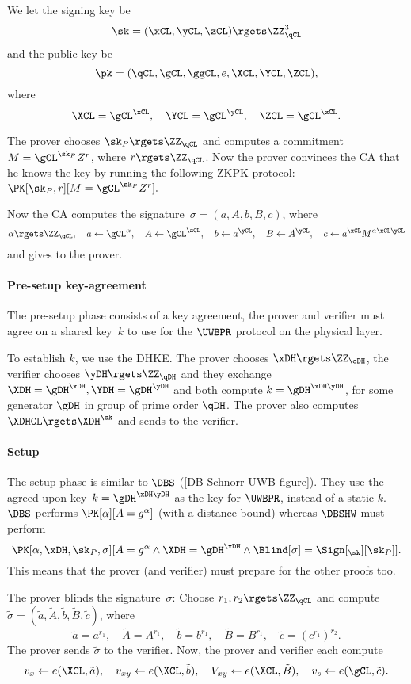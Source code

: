 We let the  signing key be \[
  \sk = (\xCL, \yCL, \zCL)\rgets \ZZ_{\qCL}^3
\] and the public key be \[
  \pk = (\qCL, \gCL, \ggCL, e, \XCL, \YCL, \ZCL),
\] where \[
  \XCL = \gCL^{\xCL}, \quad
  \YCL = \gCL^{\yCL}, \quad
  \ZCL = \gCL^{\zCL}.
\]

The prover chooses \(\sk_P\rgets \ZZ_{\qCL}\) and computes a commitment \(M = 
\gCL^{\sk_P} Z^r\), where \(r\rgets \ZZ_{\qCL}\).
Now the prover convinces the \ac{CA} that he knows the key by running the 
following \ac{ZKPK} protocol: \(
  \PK[\sk_P, r][M = \gCL^{\sk_P} Z^r].
\)

Now the \ac{CA} computes the signature~\(\sigma = (a, A, b, B, c)\), where \[
  \alpha\rgets \ZZ_{\qCL}, \quad a\gets \gCL^\alpha, \quad
  A\gets \gCL^{\zCL}, \quad
  b\gets a^{\yCL}, \quad
  B\gets A^{\yCL}, \quad
  c\gets a^{\xCL} M^{\alpha \xCL \yCL}
\] and gives to the prover.

\paragraph*{Pre-setup key-agreement}

The pre-setup phase consists of a key agreement, the prover and verifier must 
agree on a shared key~\(k\) to use for the \(\UWBPR\) protocol on the physical 
layer.

To establish \(k\), we use the \ac{DHKE}.
The prover chooses \(\xDH \rgets \ZZ_{\qDH}\), the verifier chooses 
\(\yDH\rgets \ZZ_{\qDH}\) and they exchange \(\XDH = \gDH^{\xDH}, \YDH = 
\gDH^{\yDH}\) and both compute
\(k = \gDH^{\xDH \yDH}\), for some generator \(\gDH\) in  group of 
prime order \(\qDH\).
The prover also computes \(\XDHCL\rgets \XDH^{\sk}\) and sends to the verifier.

\paragraph*{Setup}

The setup phase is similar to \(\DBS\) (\cref{DB-Schnorr-UWB-figure}).
They use the agreed upon key~\(k = \gDH^{\xDH \yDH}\) as the key for 
\(\UWBPR\), instead of a static \(k\).
\(\DBS\) performs \(
  \PK[\alpha][A = g^\alpha]
\) (with a distance bound) whereas \(\DBSHW\) must perform \[
  \PK[\alpha, \xDH, \sk_P, \sigma][
    A = g^\alpha \land
    \XDH = \gDH^{\xDH} \land
    \Blind[\sigma] = \Sign[_{\sk}][\sk_P]
  ].
\] This means that the prover (and verifier) must prepare for the other proofs 
too.

The prover blinds the signature~\(\sigma\):
Choose \(r_1, r_2\rgets \ZZ_{\qCL}\) and compute \(\tilde \sigma = (\tilde a, 
\tilde A, \tilde b, \tilde B, \tilde c)\), where \[
  \tilde a = a^{r_1}, \quad
  \tilde A = A^{r_1}, \quad
  \tilde b = b^{r_1}, \quad
  \tilde B = B^{r_1}, \quad
  \tilde c = (c^{r_1})^{r_2}.
\]
The prover sends \(\tilde \sigma\) to the verifier.
Now, the prover and verifier each compute \[
  v_x\gets e(\XCL, \tilde a), \quad
  v_{xy}\gets e(\XCL, \tilde b), \quad
  V_{xy}\gets e(\XCL, \tilde B), \quad
  v_s\gets e(\gCL, \tilde c).
\]

